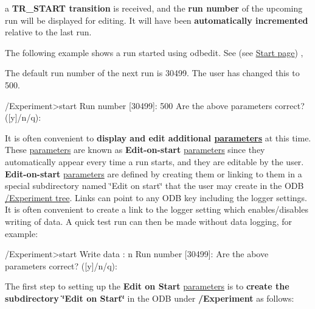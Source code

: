 a {\bfseries  TR\_\-START transition } is received, and the {\bfseries run number} of the upcoming run will be displayed for editing. It will have been {\bfseries automatically incremented} relative to the last run.

The following example shows a run started using  odbedit. See (see \hyperlink{RC_mhttpd_Start_page}{Start page}) ,

The default run number of the next run is 30499. The user has changed this to 500. 
\begin{DoxyCode}
/Experiment>start
Run number [30499]: 500
Are the above parameters correct? ([y]/n/q): 
\end{DoxyCode}


\label{RC_customize_ODB_idx_edit-on-start}
\hypertarget{RC_customize_ODB_idx_edit-on-start}{}
 \label{RC_customize_ODB_idx_ODB_tree_Experiment_Edit-on-Start-parameters}
\hypertarget{RC_customize_ODB_idx_ODB_tree_Experiment_Edit-on-Start-parameters}{}


It is often convenient to {\bfseries display and edit additional \hyperlink{structparameters}{parameters} } at this time. These \hyperlink{structparameters}{parameters} are known as {\bfseries Edit-\/on-\/start} \hyperlink{structparameters}{parameters} since they automatically appear every time a run starts, and they are editable by the user. {\bfseries Edit-\/on-\/start} \hyperlink{structparameters}{parameters} are defined by creating them or linking to them in a special subdirectory named \char`\"{}Edit on start\char`\"{} that the user may create in the ODB \hyperlink{RC_customize_ODB_RC_ODB_Experiment_Tree}{/Experiment tree}. Links can point to any ODB key including the logger settings. It is often convenient to create a link to the logger setting which enables/disables writing of data. A quick test run can then be made without data logging, for example: 
\begin{DoxyCode}
/Experiment>start
Write data : n
Run number [30499]:
Are the above parameters correct? ([y]/n/q):  
\end{DoxyCode}


The first step to setting up the {\bfseries Edit on Start} \hyperlink{structparameters}{parameters} is to {\bfseries create the subdirectory \char`\"{}Edit on Start\char`\"{}} in the ODB under {\bfseries /Experiment} as follows: 


